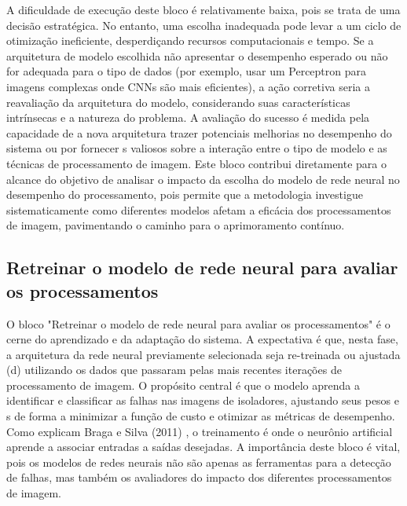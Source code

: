 A dificuldade de execução deste bloco é relativamente baixa, pois se trata de uma decisão estratégica. No entanto, uma escolha inadequada pode levar a um ciclo de otimização ineficiente, desperdiçando recursos computacionais e tempo. Se a arquitetura de modelo escolhida não apresentar o desempenho esperado ou não for adequada para o tipo de dados (por exemplo, usar um Perceptron para imagens complexas onde CNNs são mais eficientes), a ação corretiva seria a reavaliação da arquitetura do modelo, considerando suas características intrínsecas e a natureza do problema. A avaliação do sucesso é medida pela capacidade de a nova arquitetura trazer potenciais melhorias no desempenho do sistema ou por fornecer s valiosos sobre a interação entre o tipo de modelo e as técnicas de processamento de imagem. Este bloco contribui diretamente para o alcance do objetivo de analisar o impacto da escolha do modelo de rede neural no desempenho do processamento, pois permite que a metodologia investigue sistematicamente como diferentes modelos afetam a eficácia dos processamentos de imagem, pavimentando o caminho para o aprimoramento contínuo.

\subsection{Retreinar o modelo de rede neural para avaliar os processamentos}
O bloco "Retreinar o modelo de rede neural para avaliar os processamentos" é o cerne do aprendizado e da adaptação do sistema. A expectativa é que, nesta fase, a arquitetura da rede neural previamente selecionada seja re-treinada ou ajustada (d) utilizando os dados que passaram pelas mais recentes iterações de processamento de imagem. O propósito central é que o modelo aprenda a identificar e classificar as falhas nas imagens de isoladores, ajustando seus pesos e s de forma a minimizar a função de custo e otimizar as métricas de desempenho. Como explicam Braga e Silva (2011) \cite{Braga2011}, o treinamento é onde o neurônio artificial aprende a associar entradas a saídas desejadas. A importância deste bloco é vital, pois os modelos de redes neurais não são apenas as ferramentas para a detecção de falhas, mas também os avaliadores do impacto dos diferentes processamentos de imagem.

